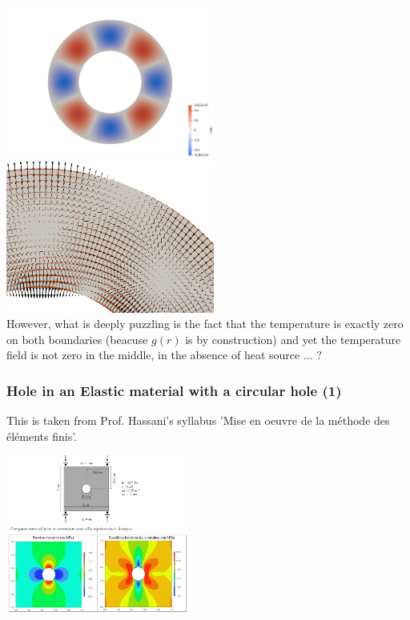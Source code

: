 \includegraphics[height=5cm]{images/benchmark_annulus_conv/T}
\includegraphics[height=5cm]{images/benchmark_annulus_conv/arrows}\\

However, what is deeply puzzling is the fact that the temperature is exactly zero on both 
boundaries (beacuse $g(r)$ is by construction) 
and yet the temperature field is not zero in the middle, in the absence of heat source ... ?


\subsubsection{Hole in an Elastic material with a circular hole (1)\label{sec:elastic_hole}}

This is taken from Prof. Hassani's syllabus 'Mise en oeuvre de la m\'ethode des 
\'el\'ements finis'.

\begin{center}
\includegraphics[width=6cm]{images/benchmark_elastic_hole/hassani}
\end{center}

